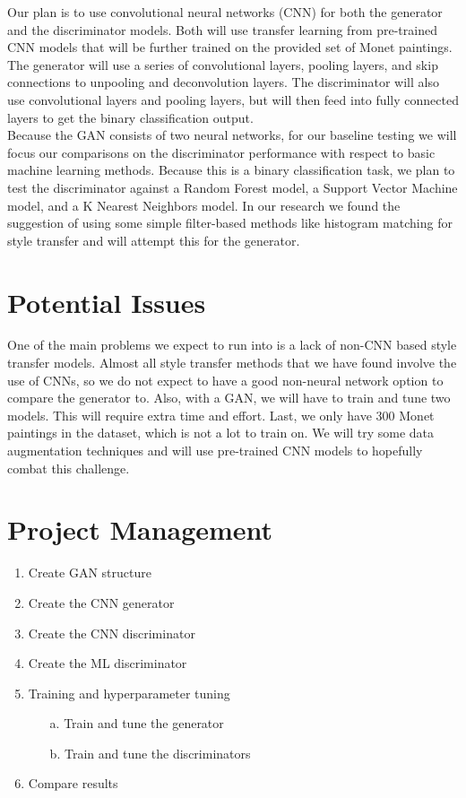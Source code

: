\documentclass[11pt, letterpaper]{article}
\begin{document}
Our plan is to use convolutional neural networks (CNN) for both the generator and the discriminator models. Both will use transfer learning from pre-trained CNN models that will be further trained on the provided set of Monet paintings. The generator will use a series of convolutional layers, pooling layers, and skip connections to unpooling and deconvolution layers. The discriminator will also use convolutional layers and pooling layers, but will then feed into fully connected layers to get the binary classification output. \\

Because the GAN consists of two neural networks, for our baseline testing we will focus our comparisons on the discriminator performance with respect to basic machine learning methods. Because this is a binary classification task, we plan to test the discriminator against a Random Forest model, a Support Vector Machine model, and a K Nearest Neighbors model. In our research we found the suggestion of using some simple filter-based methods like histogram matching for style transfer and will attempt this for the generator.

\section*{Potential Issues}
One of the main problems we expect to run into is a lack of non-CNN based style transfer models. Almost all style transfer methods that we have found involve the use of CNNs, so we do not expect to have a good non-neural network option to compare the generator to. Also, with a GAN, we will have to train and tune two models. This will require extra time and effort. Last, we only have 300 Monet paintings in the dataset, which is not a lot to train on. We will try some data augmentation techniques and will use pre-trained CNN models to hopefully combat this challenge.

\section*{Project Management}
\begin{enumerate}
	\item Create GAN structure
	\item Create the CNN generator
	\item Create the CNN discriminator
	\item Create the ML discriminator
	\item Training and hyperparameter tuning
		\begin{itemize}
			\item[a.] Train and tune the generator
			\item [b.] Train and tune the discriminators
		\end{itemize}
	\item Compare results
\end{enumerate}
\end{document}
